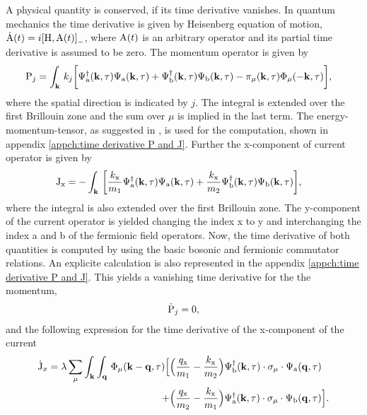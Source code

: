 A physical quantity is conserved, if its time derivative vanishes.
In quantum mechanics the time derivative is given by Heisenberg equation of motion, $\dot{\mt{A}}(t) = i\comm{\mt{H}}{\mt{A}(t)}_{-}$, where $\mathrm{A}(t)$ is an arbitrary operator and its partial time derivative is assumed to be zero.
The momentum operator is given by 
%
\begin{align}
	\mathrm{P}_{j} &= \int_{\vb{k}}\, 
		k_{j}\bigg[
	 		\Psi_{\mathrm{a}}^{\dag}(\vb{k},\tau) \Psi_{\mathrm{a}}(\vb{k},\tau)
	 		+
	 		\Psi_{\mathrm{b}}^{\dag}(\vb{k},\tau) \Psi_{\mathrm{b}}(\vb{k},\tau)
	 		-
	 		\pi_{\mu}(\vb{k},\tau) \Phi_{\mu}(-\vb{k},\tau)
		\bigg],
		\label{eq:momentum operator}
\end{align}
%
where the spatial direction is indicated by $j$.
The integral is extended over the first Brillouin zone and the sum over $\mu$ is implied in the last term.
The energy-momentum-tensor, as suggested in \cite{Iliev}, is used for the computation, shown in appendix \ref{appch:time derivative P and J}.
Further the x-component of current operator is given by
%
\begin{align}
	\mathrm{J}_{\mathrm{x}} &= - \int_{\vb{k}}\, \bigg[
		\frac{k_{\mathrm{x}}}{m_{1}} \Psi_{\mathrm{a}}^{\dag}(\vb{k},\tau) \Psi_{\mathrm{a}}(\vb{k},\tau)
		+ 
		\frac{k_{\mathrm{x}}}{m_{2}} \Psi_{\mathrm{b}}^{\dag}(\vb{k},\tau) \Psi_{\mathrm{b}}(\vb{k},\tau)
	\bigg],
	\label{eq:current operator}
\end{align}
%
where the integral is also extended over the first Brillouin zone.
The y-component of the current operator is yielded changing the index x to y and interchanging the index a and b of the fermionic field operators.
Now, the time derivative of both quantities is computed by using the basic bosonic and fermionic commutator relations.
An explicite calculation is also represented in the appendix \ref{appch:time derivative P and J}.
This yields a vanishing time derivative for the the momentum,
%
\begin{align}
	\dot{\mathrm{P}}_{j} = 0,
	\label{eq:time derivative momentum}
\end{align}
%
and the following expression for the time derivative of the x-component of the current
%
\begin{align}
	\dot{\mathrm{J}}_{x} = \lambda
		\sum\limits_{\mu} \int_{\vb{k}} \int_{\vb{q}}\,
		\Phi_{\mu}(\vb{k}-\vb{q},\tau)
		\Big[
			&\Big(\frac{q_{\mathrm{x}}}{m_{1}} - \frac{k_{\mathrm{x}}}{m_{2}}\Big)
			\Psi_{\mathrm{b}}^{\dag}(\vb{k},\tau) \cdot \sigma_{\mu} \cdot \Psi_{\mathrm{a}}(\vb{q},\tau)
			\notag \\+
			&\Big(\frac{q_{\mathrm{x}}}{m_{2}} - \frac{k_{\mathrm{x}}}{m_{1}}\Big)
			\Psi_{\mathrm{a}}^{\dag}(\vb{k},\tau) \cdot \sigma_{\mu} \cdot \Psi_{\mathrm{b}}(\vb{q},\tau)
		\Big].
		\label{eq:time derivative current}
\end{align}
